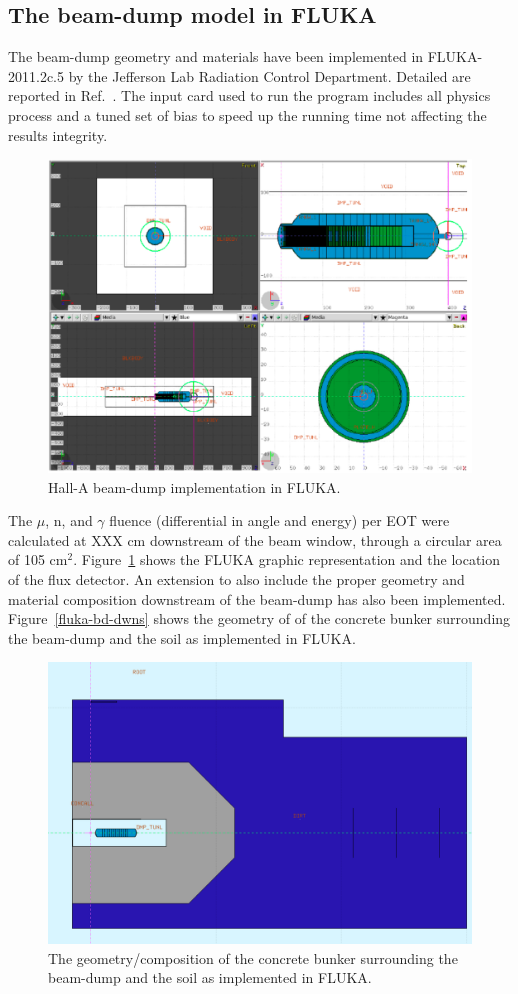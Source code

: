\subsection{The beam-dump model in FLUKA}
The beam-dump geometry and  materials have  been implemented in FLUKA-2011.2c.5 by the Jefferson Lab Radiation Control Department. Detailed are reported in Ref.~\cite{jnote-bd}.  The input card used to run the program  includes all physics process and a tuned set of bias to speed up the running time not affecting the results integrity. 
\begin{figure}[h!] 
\center
\includegraphics[width=12.5cm]{figs/fluka-bd.pdf}
\caption{Hall-A beam-dump implementation in FLUKA. }
\label{fig:fluka-bd}
\end{figure}
The $\mu$, n, and $\gamma$ fluence (differential in angle and energy) per EOT were  calculated   at XXX cm  downstream of the beam window, through a circular area of 105 cm$^2$. Figure~\ref{fig:fluka-bd} shows the FLUKA graphic representation and the location of the flux detector.
An extension to also include the proper geometry and material composition downstream of the beam-dump has also been implemented.
Figure~\ref{fluka-bd-dwns}  shows the geometry of of the concrete bunker surrounding the beam-dump and  the soil as implemented in FLUKA.

\begin{figure}[h!] 
\center
\includegraphics[width=12.5cm]{figs/fluka-bd-dwns.pdf}
\caption{The geometry/composition  of the concrete bunker surrounding the beam-dump and  the soil as implemented in FLUKA.}
\label{fig:fluka-bd-dwns}
\end{figure}


